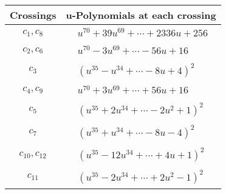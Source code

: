 \documentclass[1p]{elsarticle_modified}
\theoremstyle{definition}
\begin{document}
\begin{tabular}{m{50pt}|m{274pt}}
Crossings & \hspace{64pt}u-Polynomials at each crossing \\
\hline $$\begin{aligned}c_{1},c_{8}\end{aligned}$$&$\begin{aligned}
&u^{70}+39 u^{69}+\cdots+2336 u+256
\end{aligned}$\\
\hline $$\begin{aligned}c_{2},c_{6}\end{aligned}$$&$\begin{aligned}
&u^{70}-3 u^{69}+\cdots-56 u+16
\end{aligned}$\\
\hline $$\begin{aligned}c_{3}\end{aligned}$$&$\begin{aligned}
&(u^{35}- u^{34}+\cdots-8 u+4)^{2}
\end{aligned}$\\
\hline $$\begin{aligned}c_{4},c_{9}\end{aligned}$$&$\begin{aligned}
&u^{70}+3 u^{69}+\cdots+56 u+16
\end{aligned}$\\
\hline $$\begin{aligned}c_{5}\end{aligned}$$&$\begin{aligned}
&(u^{35}+2 u^{34}+\cdots-2 u^2+1)^{2}
\end{aligned}$\\
\hline $$\begin{aligned}c_{7}\end{aligned}$$&$\begin{aligned}
&(u^{35}+u^{34}+\cdots-8 u-4)^{2}
\end{aligned}$\\
\hline $$\begin{aligned}c_{10},c_{12}\end{aligned}$$&$\begin{aligned}
&(u^{35}-12 u^{34}+\cdots+4 u+1)^{2}
\end{aligned}$\\
\hline $$\begin{aligned}c_{11}\end{aligned}$$&$\begin{aligned}
&(u^{35}-2 u^{34}+\cdots+2 u^2-1)^{2}
\end{aligned}$\\
\hline
\end{tabular}\\~\\
\end{document}
